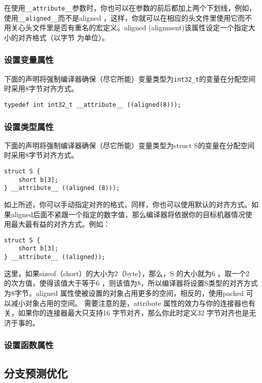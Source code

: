 			在使用\texttt{__attribute__}参数时，你也可以在参数的前后都加上两个下划线，例如，使用\texttt{__aligned__}而不是aligned ，这样，你就可以在相应的头文件里使用它而不用关心头文件里是否有重名的宏定义。aligned (alignment)该属性设定一个指定大小的对齐格式（以字节 为单位）。		

			\subsubsection{设置变量属性}
				下面的声明将强制编译器确保（尽它所能）变量类型为\texttt{int32_t}的变量在分配空间时采用8字节对齐方式。

\begin{verbatim}
typedef int int32_t __attribute__ ((aligned(8)));
\end{verbatim}
			\subsubsection{设置类型属性}

				下面的声明将强制编译器确保（尽它所能）变量类型为struct S的变量在分配空间时采用8字节对齐方式。				
\begin{verbatim}
struct S {
	short b[3];
} __attribute__ ((aligned (8)));
\end{verbatim}

			如上所述，你可以手动指定对齐的格式，同样，你也可以使用默认的对齐方式。如果aligned后面不紧跟一个指定的数字值，那么编译器将依据你的目标机器情况使用最大最有益的对齐方式。例如：

\begin{verbatim}
struct S {
	short b[3];
} __attribute__ ((aligned));
\end{verbatim}

			这里，如果sizeof（short）的大小为2（byte），那么，S 的大小就为6 。取一个2 的次方值，使得该值大于等于6 ，则该值为8，所以编译器将设置S类型的对齐方式为8字节。aligned 属性使被设置的对象占用更多的空间，相反的，使用packed 可以减小对象占用的空间。
			需要注意的是，attribute 属性的效力与你的连接器也有关，如果你的连接器最大只支持16 字节对齐，那么你此时定义32 字节对齐也是无济于事的。

			\subsubsection{设置函数属性}
	\subsection{分支预测优化}

